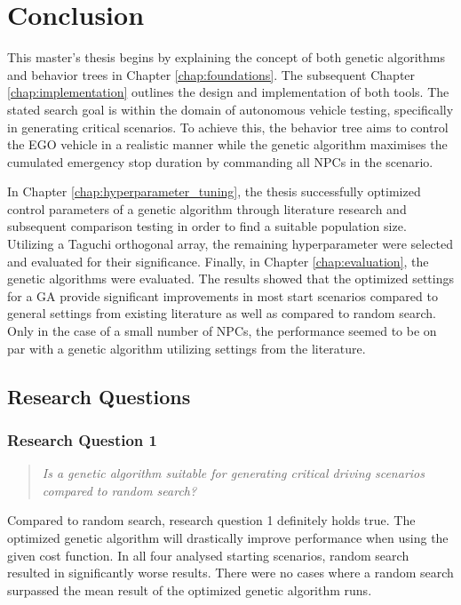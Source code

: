 \chapter{Conclusion}
This master's thesis begins by explaining the concept of both genetic algorithms and behavior trees in Chapter \ref{chap:foundations}. The subsequent Chapter \ref{chap:implementation} outlines the design and implementation of both tools. The stated search goal is within the domain of autonomous vehicle testing, specifically in generating critical scenarios. To achieve this, the behavior tree aims to control the EGO vehicle in a realistic manner while the genetic algorithm maximises the cumulated emergency stop duration by commanding all NPCs in the scenario. 

In Chapter \ref{chap:hyperparameter_tuning}, the thesis successfully optimized control parameters of a genetic algorithm through literature research and subsequent comparison testing in order to find a suitable population size. Utilizing a Taguchi orthogonal array, the remaining hyperparameter were selected and evaluated for their significance. Finally, in Chapter \ref{chap:evaluation}, the genetic algorithms were evaluated. The results showed that the optimized settings for a GA provide significant improvements in most start scenarios compared to general settings from existing literature as well as compared to random search. Only in the case of a small number of NPCs, the performance seemed to be on par with a genetic algorithm utilizing settings from the literature.

\section{Research Questions}
\subsection{Research Question 1}
\begin{quote}
	\begin{em}
		\textit{Is a genetic algorithm suitable for generating critical driving scenarios compared to random search?}
	\end{em}
\end{quote}

Compared to random search, research question 1 definitely holds true. The optimized genetic algorithm will drastically improve performance when using the given cost function. In all four analysed starting scenarios, random search resulted in significantly worse results. There were no cases where a random search surpassed the mean result of the optimized genetic algorithm runs.

